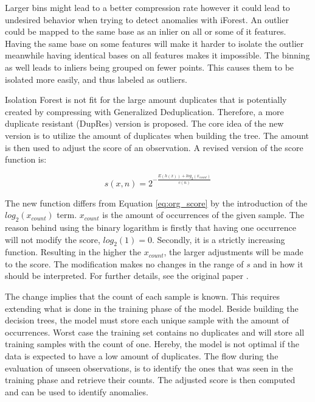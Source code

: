 Larger bins might lead to a better compression rate however it could lead to undesired behavior when trying to detect anomalies with iForest. An outlier could be mapped to the same base as an inlier on all or some of it features. Having the same base on some features will make it harder to isolate the outlier meanwhile having identical bases on all features makes it impossible. The binning as well leads to inliers being grouped on fewer points. This causes them to be isolated more easily, and thus labeled as outliers.

Isolation Forest is not fit for the large amount duplicates that is potentially created by compressing with Generalized Deduplication. Therefore, a more duplicate resistant (DupRes) version is proposed. The core idea of the new version is to utilize the amount of duplicates when building the tree. The amount is then used to adjust the score of an observation. A revised version of the score function is:

\begin{equation}
  s(x,n) = 2^{-\frac{E(h(x))+log_2(x_{count})}{c(n)}}
  \label{eq:dupres_score}
\end{equation}

The new function differs from Equation \ref{eq:org_score} by the introduction of the $log_2(x_{count})$ term. $x_{count}$ is the amount of occurrences of the given sample. The reason behind using the binary logarithm is firstly that having one occurrence will not modify the score, $log_2(1)=0$. Secondly, it is a strictly increasing function. Resulting in the higher the $x_{count}$, the larger adjustments will be made to the score. The modification makes no changes in the range of $s$ and in how it should be interpreted. For further details, see the original paper \cite{iforest}.

The change implies that the count of each sample is known. This requires extending what is done in the training phase of the model. Beside building the decision trees, the model must store each unique sample with the amount of occurrences. Worst case the training set contains no duplicates and will store all training samples with the count of one. Hereby, the model is not optimal if the data is expected to have a low amount of duplicates. The flow during the evaluation of unseen observations, is to identify the ones that was seen in the training phase and retrieve their counts. The adjusted score is then computed and can be used to identify anomalies.
